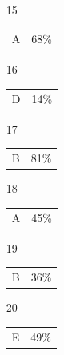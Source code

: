 \documentclass[12pt]{article}
\begin{document}
\begin{multicols}{5}
\begin{enumerate}
\item[15] \begin{tabular}{cc} A & 68\%\end{tabular}
\item[]
\item[16] \begin{tabular}{cc} D & 14\%\end{tabular}
\item[17] \begin{tabular}{cc} B & 81\%\end{tabular}
\item[18] \begin{tabular}{cc} A & 45\%\end{tabular}
\item[19] \begin{tabular}{cc} B & 36\%\end{tabular}
\item[20] \begin{tabular}{cc} E & 49\%\end{tabular}

\item[]


\end{enumerate}
\end{multicols}
\end{document}
